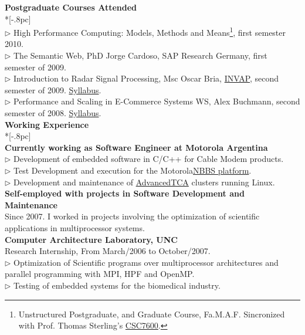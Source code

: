 \documentclass[a4paper,11pt,english]{article}
\begin{document}
{\large \bf Postgraduate Courses Attended} \\*[-.8pc]
\underline{\hspace{6in}} \\
$\triangleright$ High Performance Computing: Models, Methods and Means\footnote{Unstructured Postgraduate,
and Graduate Course, Fa.M.A.F. Sincronized with Prof. Thomas Sterling's 
\href{http://www.cct.lsu.edu/csc7600/Home.html}{CSC7600}.}, first semester 2010.\\
$\triangleright$ The Semantic Web, PhD Jorge Cardoso, SAP Research Germany, first semester of 2009.\\
$\triangleright$ Introduction to Radar Signal Processing, Msc Oscar Bria, 
\href{http://www.invap.net/index-e.php}{INVAP}, second semester of 2009. \href{http://postgrado.info.unlp.edu.ar/Carrera/Programas/Contenidos_IPSR.pdf}{Syllabus}.\\
$\triangleright$ Performance and Scaling in E-Commerce Systems WS, Alex Buchmann, second semester of 2008. 
\href{http://www.dvs.tu-darmstadt.de/teaching/perf/2008/}{Syllabus}.\\


{\large \bf Working Experience}\\*[-.8pc]
\underline{\hspace{6in}} \\
{\bf Currently working as Software Engineer at Motorola Argentina}\\
$\triangleright$ Development of embedded software in C/C++ for Cable Modem products.\\
$\triangleright$ Test Development and execution for the Motorola\href{http://www.netopia.com/software/products/nbbs/nbbs_ds.pdf}{NBBS platform}.\\
$\triangleright$ Development and maintenance of \href{http://en.wikipedia.org/wiki/Advanced_Telecommunications_Computing_Architecture}{AdvancedTCA} clusters running Linux.\\

{\bf Self-employed with projects in Software Development and Maintenance}\\
Since 2007. I worked in projects involving the optimization of scientific applications in multiprocessor systems.
\\

{\bf Computer Architecture Laboratory, UNC}\\
Research Internship, From March/2006 to October/2007.\\
$\triangleright$ Optimization of Scientific programs over multiprocessor architectures 
and parallel programming with MPI, HPF and OpenMP.\\
$\triangleright$ Testing of embedded systems for the biomedical industry.\\
 
\end{document}
